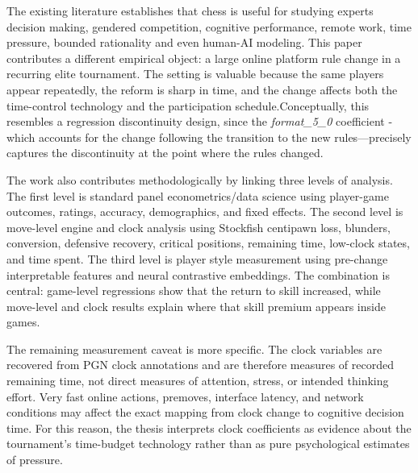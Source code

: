 The existing literature establishes that chess is useful for studying experts decision making, gendered competition, cognitive performance, remote work, time pressure, bounded rationality and even human-AI modeling. This paper contributes a different empirical object: a large online platform rule change in a recurring elite tournament. The setting is valuable because the same players appear repeatedly, the reform is sharp in time, and the change affects both the time-control technology and the participation schedule.Conceptually, this resembles a regression discontinuity design, since the \textit{format\_5\_0} coefficient - which accounts for the change following the transition to the new rules—precisely captures the discontinuity at the point where the rules changed.

The work also contributes methodologically by linking three levels of analysis. The first level is standard panel econometrics/data science using player-game outcomes, ratings, accuracy, demographics, and fixed effects. The second level is move-level engine and clock analysis using Stockfish centipawn loss, blunders, conversion, defensive recovery, critical positions, remaining time, low-clock states, and time spent. The third level is player style measurement using pre-change interpretable features and neural contrastive embeddings. The combination is central: game-level regressions show that the return to skill increased, while move-level and clock results explain where that skill premium appears inside games.

The remaining measurement caveat is more specific. The clock variables are recovered from PGN clock annotations and are therefore measures of recorded remaining time, not direct measures of attention, stress, or intended thinking effort. Very fast online actions, premoves, interface latency, and network conditions may affect the exact mapping from clock change to cognitive decision time. For this reason, the thesis interprets clock coefficients as evidence about the tournament's time-budget technology rather than as pure psychological estimates of pressure.
